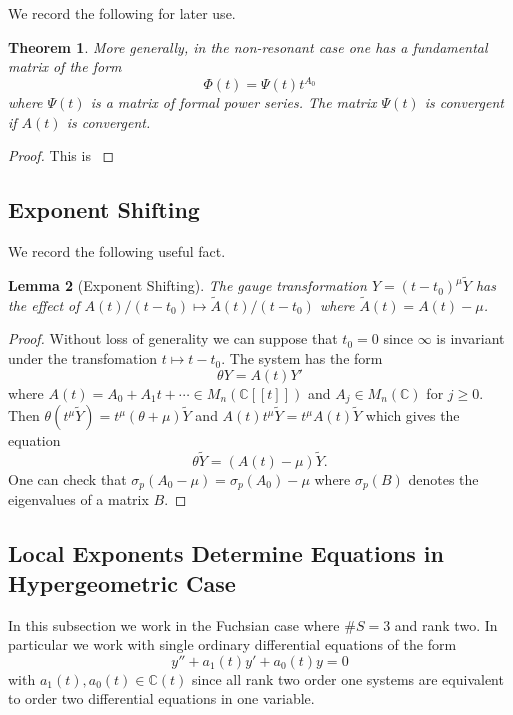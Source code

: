 \documentclass[12pt]{book}
\numberwithin{equation}{section}
\newtheorem{theorem}{Theorem}[subsection]
\newtheorem{lemma}[theorem]{Lemma}
\theoremstyle{definition}
\theoremstyle{remark}
\newcommand{\CC}{\mathbb{C}}
\begin{document}
We record the following for later use. 
\begin{theorem}
	More generally, in the non-resonant case one has a fundamental matrix of the form 
	$$ \Phi(t) = \Psi(t) t^{A_0} $$
	where $\Psi(t)$ is a matrix of formal power series. 
	The matrix $\Psi(t)$ is convergent if $A(t)$ is convergent.
\end{theorem}
\begin{proof}
	This is \cite[III, Proposition 1.2.1]{Borel1987}
\end{proof}

\subsection{Exponent Shifting}
We record the following useful fact.
\begin{lemma}[Exponent Shifting]\label{L:exponent-shifting}
	The gauge transformation $Y=(t-t_0)^{\mu}\widetilde{Y}$ has the effect of $A(t)/(t-t_0)\mapsto \widetilde{A}(t)/(t-t_0)$ where $\widetilde{A}(t) = A(t)-\mu$.
\end{lemma}
\begin{proof}
	Without loss of generality we can suppose that $t_0=0$ since $\infty$ is invariant under the transfomation $t\mapsto t-t_0$. 
	The system has the form 
	 $$ \theta Y = A(t) Y' $$
	where $A(t) = A_0 + A_1 t + \cdots \in M_n(\CC[[t]])$ and $A_j \in M_n(\CC)$ for $j\geq 0$. 
	Then $\theta(t^{\mu}\widetilde{Y}) = t^{\mu}(\theta+\mu)\widetilde{Y}$ and $A(t)t^{\mu}\widetilde{Y} = t^{\mu}A(t)\widetilde{Y}$ which gives the equation
	 $$ \theta \widetilde{Y} = (A(t)-\mu) \widetilde{Y}.$$
	One can check that $\sigma_p(A_0-\mu) = \sigma_p(A_0)-\mu$ where $\sigma_p(B)$ denotes the eigenvalues of a matrix $B$.
\end{proof}

\subsection[Exponents Determine Equations]{Local Exponents Determine Equations in Hypergeometric Case}\label{S:hypergeometric-case}
In this subsection we work in the Fuchsian case where $\#S=3$ and rank two. 
In particular we work with single ordinary differential equations of the form
 $$ y'' + a_1(t)y' + a_0(t) y =0 $$
with $a_1(t),a_0(t) \in \CC(t)$ since all rank two order one systems are equivalent to order two differential equations in one variable.
\end{document}
